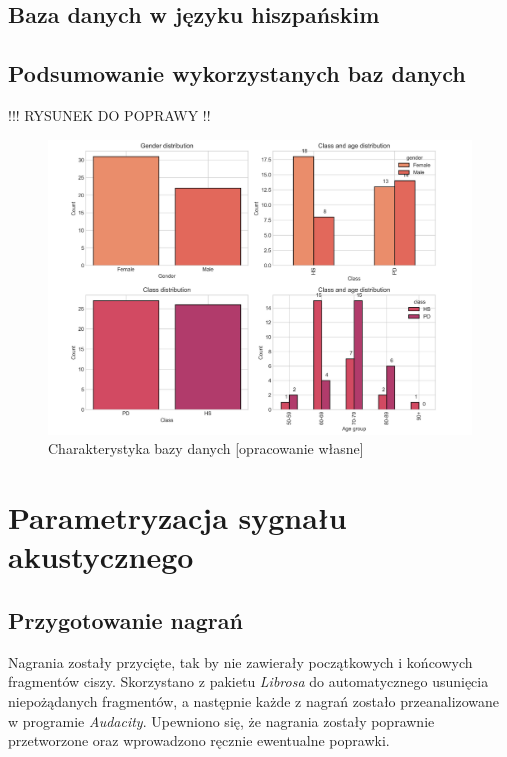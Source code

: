 \subsection{Baza danych w języku hiszpańskim}
\label{subsec:hiszpanska-baza}


\subsection{Podsumowanie wykorzystanych baz danych}
\label{subsec:podsumowanie-baz}

!!! RYSUNEK DO POPRAWY !!
\begin{figure}[htbp]
	\centering
	\includegraphics[width=1\textwidth]{./img/database}
	\caption{Charakterystyka bazy danych [opracowanie własne]}
    \label{fig:database}
\end{figure}


\section{Parametryzacja sygnału akustycznego}
\label{sec:parametryzacja-sygnalu-akustycznego}


\subsection{Przygotowanie nagrań}
\label{subsec:preprocessing}

Nagrania zostały przycięte, tak by nie zawierały początkowych i końcowych fragmentów ciszy.
Skorzystano z pakietu \emph{Librosa} do automatycznego usunięcia niepożądanych fragmentów, a następnie każde z nagrań zostało przeanalizowane w programie \emph{Audacity}.
Upewniono się, że nagrania zostały poprawnie przetworzone oraz wprowadzono ręcznie ewentualne poprawki.

